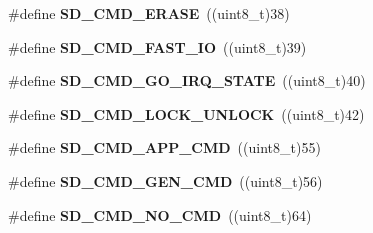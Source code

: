 \begin{DoxyCompactItemize}
\item 
\#define {\bfseries S\+D\+\_\+\+C\+M\+D\+\_\+\+E\+R\+A\+SE}~((uint8\+\_\+t)38)\hypertarget{group__sd__card_ga16f4d3918ba7fb538f8d1f3fb8bb0bd1}{}\label{group__sd__card_ga16f4d3918ba7fb538f8d1f3fb8bb0bd1}

\item 
\#define {\bfseries S\+D\+\_\+\+C\+M\+D\+\_\+\+F\+A\+S\+T\+\_\+\+IO}~((uint8\+\_\+t)39)\hypertarget{group__sd__card_gac8319cdb71748237d00c937f0fa47fda}{}\label{group__sd__card_gac8319cdb71748237d00c937f0fa47fda}

\item 
\#define {\bfseries S\+D\+\_\+\+C\+M\+D\+\_\+\+G\+O\+\_\+\+I\+R\+Q\+\_\+\+S\+T\+A\+TE}~((uint8\+\_\+t)40)\hypertarget{group__sd__card_gac71656d887c8fad884e95ec525a0a8af}{}\label{group__sd__card_gac71656d887c8fad884e95ec525a0a8af}

\item 
\#define {\bfseries S\+D\+\_\+\+C\+M\+D\+\_\+\+L\+O\+C\+K\+\_\+\+U\+N\+L\+O\+CK}~((uint8\+\_\+t)42)\hypertarget{group__sd__card_gac89f6043b27673973f4a2b7e106a5f63}{}\label{group__sd__card_gac89f6043b27673973f4a2b7e106a5f63}

\item 
\#define {\bfseries S\+D\+\_\+\+C\+M\+D\+\_\+\+A\+P\+P\+\_\+\+C\+MD}~((uint8\+\_\+t)55)\hypertarget{group__sd__card_ga389f949c4ceace711f57dd00f71a8760}{}\label{group__sd__card_ga389f949c4ceace711f57dd00f71a8760}

\item 
\#define {\bfseries S\+D\+\_\+\+C\+M\+D\+\_\+\+G\+E\+N\+\_\+\+C\+MD}~((uint8\+\_\+t)56)\hypertarget{group__sd__card_ga201db10c31dd8f6e30d99ca58dd291e6}{}\label{group__sd__card_ga201db10c31dd8f6e30d99ca58dd291e6}

\item 
\#define {\bfseries S\+D\+\_\+\+C\+M\+D\+\_\+\+N\+O\+\_\+\+C\+MD}~((uint8\+\_\+t)64)\hypertarget{group__sd__card_gab88d7dbeaf38955b1c7d2806f6b446c2}{}\label{group__sd__card_gab88d7dbeaf38955b1c7d2806f6b446c2}


\end{DoxyCompactItemize}
